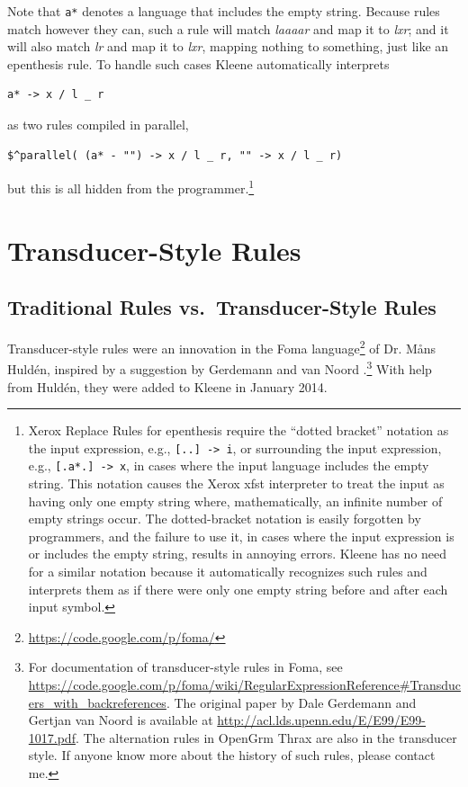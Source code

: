 \noindent
Note that \verb!a*! denotes a language that includes the empty string.
Because rules match however they can, such a rule will match \emph{laaaar} and map it to \emph{lxr}; and it will also
match \emph{lr} and map it to \emph{lxr}, mapping nothing to
something, just like an epenthesis rule.  To handle such cases Kleene
automatically interprets 

\begin{Verbatim}
a* -> x / l _ r
\end{Verbatim}

\noindent
as two rules compiled in parallel, 

\begin{Verbatim}
$^parallel( (a* - "") -> x / l _ r, "" -> x / l _ r)
\end{Verbatim}

\noindent
but this is all hidden from the programmer.\footnote{Xerox Replace Rules for epenthesis require the ``dotted bracket'' notation as
the input expression, e.g.,  \verb![..] -> i!, or surrounding the input
expression, e.g., \verb![.a*.] -> x!, in
cases where the input language includes the empty string.  This notation causes the Xerox xfst interpreter to treat
the input as having only one empty string where, mathematically, an infinite number of empty strings occur.  The
dotted-bracket notation is easily forgotten by programmers, and the failure to use it, in cases where the input
expression is or includes the empty string, results in annoying errors.  Kleene
has no need for a similar notation because it automatically recognizes such rules and interprets them as if there
were only one empty string before and after each input symbol.}

\section{Transducer-Style Rules}

\subsection{Traditional Rules vs.\ Transducer-Style Rules}

Transducer-style rules were an innovation in the Foma
language\footnote{\url{https://code.google.com/p/foma/}} of Dr.\@
M\r{a}ns Huldén, inspired by a suggestion by Gerdemann and van Noord
\citep{gerdemann+vannoord:1999}.\footnote{For documentation of
	transducer-style rules in Foma, see
\url{https://code.google.com/p/foma/wiki/RegularExpressionReference#Transducers_with_backreferences}.
The original paper by Dale Gerdemann and Gertjan van Noord is available
at \url{http://acl.lds.upenn.edu/E/E99/E99-1017.pdf}.  The alternation
rules in OpenGrm Thrax are also in the transducer style.  If anyone know
more about the history of such rules, please contact me.}  With help from
Huldén, they were added to Kleene in January 2014.

